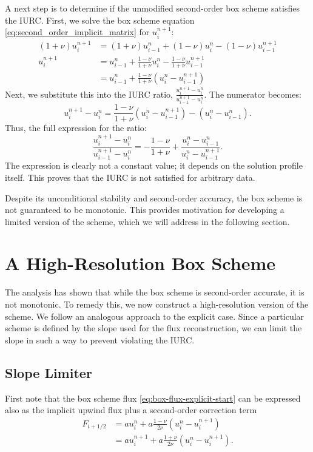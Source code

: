 A next step is to determine if the unmodified second-order box scheme satisfies the IURC.
First, we solve the box scheme equation \eqref{eq:second_order_implicit_matrix} for \(u_i^{n+1}\):
\begin{align*}
    (1+\nu)u_{i}^{n+1} &= (1+\nu)u_{i-1}^{n} + (1-\nu)u_i^{n} - (1-\nu)u_{i-1}^{n+1} \\
    u_i^{n+1} &= u_{i-1}^{n} + \frac{1-\nu}{1+\nu}u_i^{n} - \frac{1-\nu}{1+\nu}u_{i-1}^{n+1}\\
              &= u_{i-1}^{n} + \frac{1-\nu}{1+\nu}\left( u_i^{n} - u_{i-1}^{n+1} \right)
\end{align*}
Next, we substitute this into the IURC ratio, \(\frac{u_{i}^{n+1}-u_{i}^{n}}{u_{i-1}^{n+1}-u_{i}^{n}}\). The numerator becomes:
\begin{equation*}
    u_i^{n+1} - u_i^n = \frac{1-\nu}{1+\nu}\left( u_i^{n} - u_{i-1}^{n+1} \right) - \left( u_i^n - u_{i-1}^{n}  \right).
\end{equation*}
Thus, the full expression for the ratio:
\[
    \frac{u_{i}^{n+1}-u_{i}^{n}}{u_{i-1}^{n+1}-u_{i}^{n}} = 
    -\frac{1-\nu}{1+\nu} + \frac{u_{i}^{n}-u_{i-1}^{n}}{u_{i}^{n}-u_{i-1}^{n+1}}.
\]
The expression is clearly not a constant value; it depends on the solution profile itself.
This proves that the IURC is not satisfied for arbitrary data.

Despite its unconditional stability and second-order accuracy, the box scheme is not guaranteed to be monotonic.
This provides motivation for developing a limited version of the scheme, which we will address in the following section.

\section{A High-Resolution Box Scheme}
\label{sec:limited_box_scheme}

The analysis has shown that while the box scheme is second-order accurate, it is not monotonic.
To remedy this, we now construct a high-resolution version of the scheme.
We follow an analogous approach to the explicit case.
Since a particular scheme is defined by the slope used for the flux reconstruction, we can limit the slope in such a way to prevent violating the IURC.

\subsection{Slope Limiter}

First note that the box scheme flux \eqref{eq:box-flux-explicit-start} can be expressed also as the implicit upwind flux plus a second-order correction term
\begin{equation}
    \label{eq:box-flux-implicit-start}
    \begin{split}
        F_{i+1/2} &= a u_{i}^{n} + a \frac{1-\nu}{2\nu}  \left( u_{i}^{n}-u_{i}^{n+1} \right)\\
                  &= a u_{i}^{n+1} + a\frac{1+\nu}{2\nu}\left( u_{i}^{n}-u_{i}^{n+1} \right).
    \end{split}
\end{equation}

